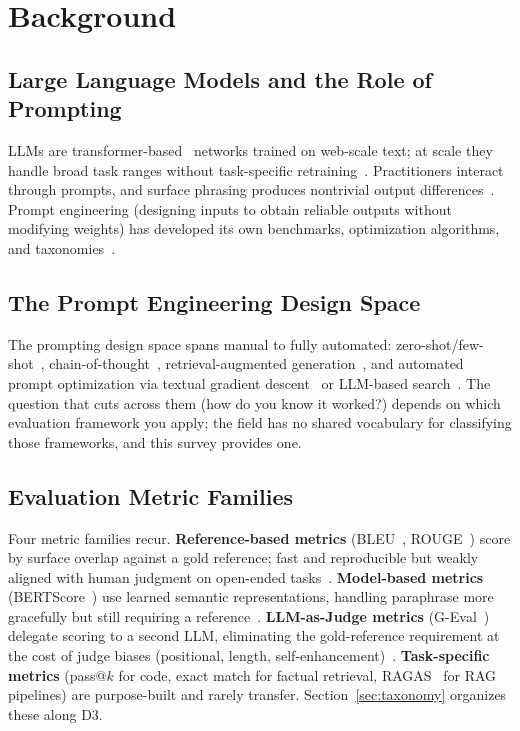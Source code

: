 \documentclass[acmsmall, nonacm, screen]{acmart}
\begin{document}
\section{Background}
\label{sec:background}

\subsection{Large Language Models and the Role of Prompting}

LLMs are transformer-based~\cite{vaswani2017attention} networks
trained on web-scale text; at scale they handle broad task ranges
without task-specific retraining~\cite{devlin2019bert, brown2020gpt3,
bommasani2021foundation}. Practitioners interact through prompts, and
surface phrasing produces nontrivial output
differences~\cite{sclar2023formatting, zhou2022ape}. Prompt
engineering (designing inputs to obtain reliable outputs without
modifying weights) has developed its own benchmarks, optimization
algorithms, and taxonomies~\cite{sahoo2024systematic, schulhoff2024prompt}.

\subsection{The Prompt Engineering Design Space}

The prompting design space spans manual to fully automated:
zero-shot/few-shot~\cite{brown2020gpt3},
chain-of-thought~\cite{wei2022chain}, retrieval-augmented
generation~\cite{lewis2020retrieval}, and automated prompt optimization
via textual gradient descent~\cite{pryzant2023apo} or LLM-based
search~\cite{zhou2022ape}. The question that cuts across them (how do
you know it worked?) depends on which evaluation framework you apply;
the field has no shared vocabulary for classifying those frameworks,
and this survey provides one.

\subsection{Evaluation Metric Families}

Four metric families recur. \textbf{Reference-based metrics}
(BLEU~\cite{papineni2002bleu}, ROUGE~\cite{lin2004rouge}) score by
surface overlap against a gold reference; fast and reproducible but
weakly aligned with human judgment on open-ended
tasks~\cite{liu2023geval, repairing2022}. \textbf{Model-based
metrics} (BERTScore~\cite{zhang2020bertscore}) use learned semantic
representations, handling paraphrase more gracefully but still
requiring a reference~\cite{chang2023survey}. \textbf{LLM-as-Judge
metrics} (G-Eval~\cite{liu2023geval}) delegate scoring to a second
LLM, eliminating the gold-reference requirement at the cost of
judge biases (positional, length,
self-enhancement)~\cite{zheng2023judging, gu2025llmjudge}.
\textbf{Task-specific metrics} (pass@$k$ for code, exact match for
factual retrieval, RAGAS~\cite{rageval2024} for RAG pipelines) are
purpose-built and rarely transfer.
Section~\ref{sec:taxonomy} organizes these along D3.
\end{document}
